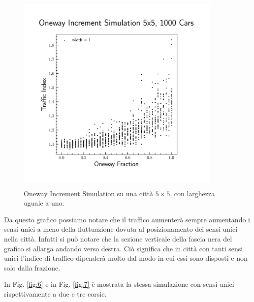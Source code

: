 \documentclass[main.tex]{subfiles}
\begin{document}
        \begin{figure}[H]
            \centering
            \includegraphics[width=10cm, height=10cm]{oneway_increment_1.png}  
            \caption{Oneway Increment Simulation su una città $5 \times 5$, con larghezza uguale a uno.}
            \label{fig:5}
        \end{figure}

        Da questo grafico possiamo notare che il traffico aumenterà sempre aumentando i sensi unici a meno della fluttuazione dovuta
        al posizionamento dei sensi unici nella città. Infatti si può notare che la sezione verticale della fascia nera del grafico si allarga
        andando verso destra. Ciò significa che in città con tanti sensi unici l'indice di traffico dipenderà molto dal modo in cui essi sono disposti
        e non solo dalla frazione.

        \newpage

        In Fig. \ref{fig:6} e in Fig. \ref{fig:7} è mostrata la stessa simulazione con sensi unici rispettivamente a due e tre corsie.
\end{document}
